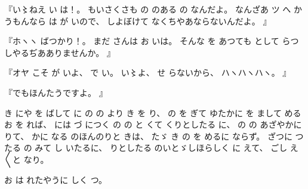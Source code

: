 『い〻ねえ%
い
は！。
%
もいさくさも
の
のある
の
なんだよ。
%
なんざあ
ツ
へ
かうもんなら
は
が
いので、
%
しよぼけて
なくちやあならないんだよ。
』

『ホヽヽ
ばつかり！。
%
まだ
さんは
お
いは。
%
そんな
を
あつても
として
らつしやるぢあありませんか。
』

『オヤ
こそ
が
いよ、
%
で
い。
%
い〻よ、%
%
せ
らないから、
%
ハヽハヽハヽ。
』

『でもほんたうですよ。
』

き%
にや
を
ばして
に
の
の
より
き
を
り、
%
の
を
ぎて
ゆたかに
を
まして
める
お
を
れば、
%
には
づ
につく
の
の
と
くて
くりとしたる
に、
%
の
の
あざやかに
りて、
%
かに
なる
のほんのりと
きは、
%
たゞ
き
の
を
めるに
ならず。
%
ざつに
つたる
の
みて
し
いたるに、
%
りとしたる
のいとゞしほらしく
に
えて、
%
ごし
え〳〵と
なり。%

お
は
れたやうに
しく
つ。

